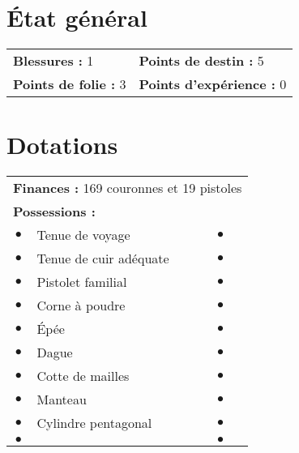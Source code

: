 \documentclass{scrartcl}
\begin{document}
\section*{{\'E}tat général}

\begin{tabular}{X{\arrlenZ} X{\arrlenZ}}
\textbf{Blessures :} 1 & \textbf{Points de destin :} 5 \\
\textbf{Points de folie :} 3 & \textbf{Points d'expérience :} 0 \\
\end{tabular}

\section*{Dotations}

\begin{tabular}{cX{\arrlenZ} cX{\arrlenZ}}
\multicolumn{4}{l}{\textbf{Finances :} 169 couronnes et 19 pistoles} \\
\multicolumn{4}{l}{\textbf{Possessions :}} \\
$\bullet$ & Tenue de voyage & $\bullet$ & \\
$\bullet$ & Tenue de cuir adéquate & $\bullet$ & \\
$\bullet$ & Pistolet familial & $\bullet$ & \\
$\bullet$ & Corne à poudre & $\bullet$ & \\
$\bullet$ & Épée & $\bullet$ & \\
$\bullet$ & Dague & $\bullet$ & \\
$\bullet$ & Cotte de mailles & $\bullet$ & \\
$\bullet$ & Manteau & $\bullet$ & \\
$\bullet$ & Cylindre pentagonal & $\bullet$ & \\
$\bullet$ & & $\bullet$ & \\
\end{tabular}
\end{document}
